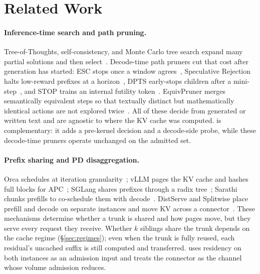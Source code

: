 \section{Related Work}
\label{sec:related}

\paragraph{Inference-time search and path pruning.}
Tree-of-Thoughts, self-consistency, and Monte Carlo tree search expand many partial solutions and then select~\cite{tot,selfconsistency,mctsllm,cot}.
Decode-time path pruners cut that cost after generation has started: ESC stops once a window agrees~\cite{esc}, Speculative Rejection halts low-reward prefixes at a horizon~\cite{specrej}, DPTS early-stops children after a mini-step~\cite{dpts}, and STOP trains an internal futility token~\cite{stoploss}.
EquivPruner merges semantically equivalent steps so that textually distinct but mathematically identical actions are not explored twice~\cite{equivpruner}.
All of these decide from generated or written text and are agnostic to where the KV cache was computed.
\sys is complementary: it adds a pre-kernel decision and a decode-side probe, while these decode-time pruners operate unchanged on the admitted set.

\paragraph{Prefix sharing and PD disaggregation.}
Orca schedules at iteration granularity~\cite{orca}; vLLM pages the KV cache and hashes full blocks for APC~\cite{vllm}; SGLang shares prefixes through a radix tree~\cite{sglang}; Sarathi chunks prefills to co-schedule them with decode~\cite{sarathi,sarathisplit}.
DistServe and Splitwise place prefill and decode on separate instances and move KV across a connector~\cite{distserve,splitwise}.
These mechanisms determine whether a trunk is shared and how pages move, but they serve every request they receive.
Whether $k$ siblings share the trunk depends on the cache regime (\S\ref{sec:regimes}); even when the trunk is fully reused, each residual's uncached suffix is still computed and transferred.
\sys uses residency on both instances as an admission input and treats the connector as the channel whose volume admission reduces.

